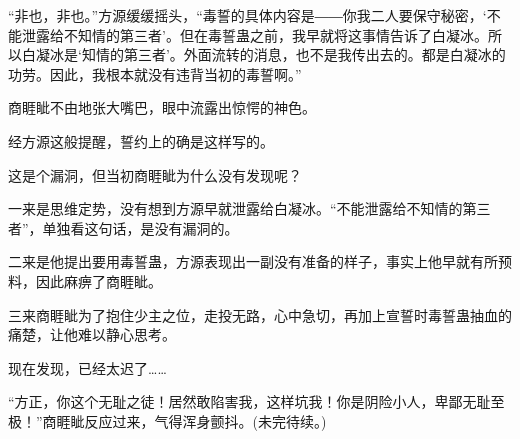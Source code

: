 \begin{this_body}
“非也，非也。”方源缓缓摇头，“毒誓的具体内容是――你我二人要保守秘密，‘不能泄露给不知情的第三者’。但在毒誓蛊之前，我早就将这事情告诉了白凝冰。所以白凝冰是‘知情的第三者’。外面流转的消息，也不是我传出去的。都是白凝冰的功劳。因此，我根本就没有违背当初的毒誓啊。”

商睚眦不由地张大嘴巴，眼中流露出惊愕的神色。

经方源这般提醒，誓约上的确是这样写的。

这是个漏洞，但当初商睚眦为什么没有发现呢？

一来是思维定势，没有想到方源早就泄露给白凝冰。“不能泄露给不知情的第三者”，单独看这句话，是没有漏洞的。

二来是他提出要用毒誓蛊，方源表现出一副没有准备的样子，事实上他早就有所预料，因此麻痹了商睚眦。

三来商睚眦为了抱住少主之位，走投无路，心中急切，再加上宣誓时毒誓蛊抽血的痛楚，让他难以静心思考。

现在发现，已经太迟了……

“方正，你这个无耻之徒！居然敢陷害我，这样坑我！你是阴险小人，卑鄙无耻至极！”商睚眦反应过来，气得浑身颤抖。(未完待续。)

\end{this_body}

